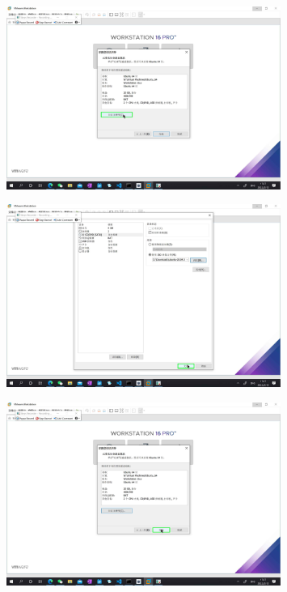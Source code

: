 \documentclass[UTF8]{ctexart}
\begin{document}
    \begin{figure}[H]
        \centering
        \includegraphics[width=0.8\textwidth]{assets/u18.png}
    \end{figure}
    \begin{figure}[H]
        \centering
        \includegraphics[width=0.8\textwidth]{assets/u19.png}
    \end{figure}
    \begin{figure}[H]
        \centering
        \includegraphics[width=0.8\textwidth]{assets/u20.png}
    \end{figure}
    
\end{document}
